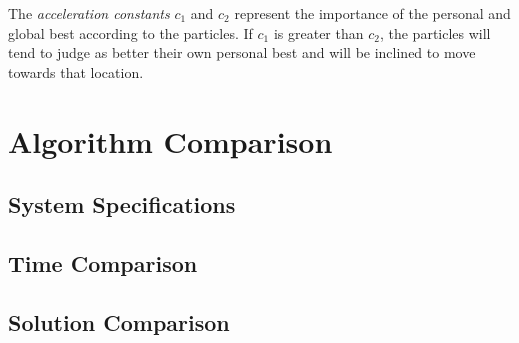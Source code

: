 The \textit{acceleration constants} $c_1$ and $c_2$ represent
the importance of the personal and global best according to the particles.
If $c_1$ is greater than $c_2$, the particles will tend to judge as better
their own personal best and will be inclined to move towards that location.









\section{Algorithm Comparison}
\label{sec:5.res}

\subsection{System Specifications}
\subsection{Time Comparison}
\subsection{Solution Comparison}